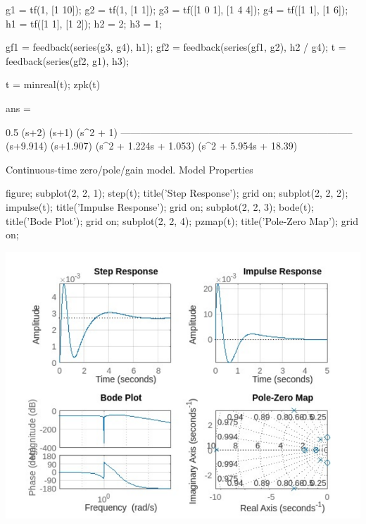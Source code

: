 \documentclass[journal, onecolumn]{IEEEtran}
\begin{document}
\begin{matlabcode}
g1 = tf(1, [1 10]);
g2 = tf(1, [1 1]);
g3 = tf([1 0 1], [1 4 4]);
g4 = tf([1 1], [1 6]);
h1 = tf([1 1], [1 2]);
h2 = 2;
h3 = 1;

gf1 = feedback(series(g3, g4), h1);
gf2 = feedback(series(gf1, g2), h2 / g4);
t = feedback(series(gf2, g1), h3);

t = minreal(t);
zpk(t)
\end{matlabcode}
\begin{matlaboutput}
ans =

                        0.5 (s+2) (s+1) (s^2 + 1)
  -----------------------------------------------------------------------
  (s+9.914) (s+1.907) (s^2 + 1.224s + 1.053) (s^2 + 5.954s + 18.39)

Continuous-time zero/pole/gain model.
Model Properties
\end{matlaboutput}
\begin{matlabcode}

figure;
subplot(2, 2, 1); step(t); title('Step Response'); grid on;
subplot(2, 2, 2); impulse(t); title('Impulse Response'); grid on;
subplot(2, 2, 3); bode(t); title('Bode Plot'); grid on;
subplot(2, 2, 4); pzmap(t); title('Pole-Zero Map'); grid on;
\end{matlabcode}
\begin{center}
\includegraphics[width=\maxwidth{56.196688409433015em}]{figure_0.pdf}
\end{center}
\end{document}
